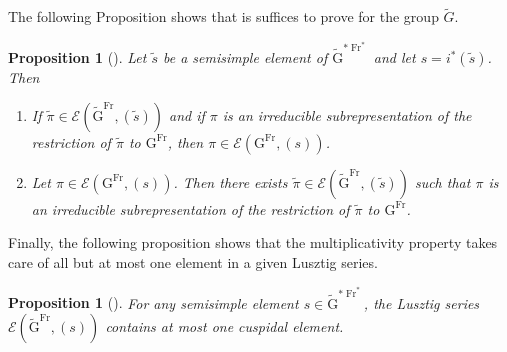 \documentclass[12pt, reqno]{amsart}
\newtheorem{proposition}[theorem]{Proposition}
\theoremstyle{definition}
\theoremstyle{definition}
\theoremstyle{definition}
\newcommand{\GroupExtension}[1]{\widetilde{#1}}
\newcommand{\Frobenius}{\operatorname{Fr}}
\newcommand{\algebraicGroup}[1]{\boldsymbol{\mathrm{#1}}}
\newcommand{\LusztigSeries}[2]{\mathcal{E}\left(#1, (#2)\right)}
\newcommand{\DualFrobeniusFixedPoints}[2][\Frobenius^{\ast}]{\algebraicGroup{#2}^{\ast #1}}
\newcommand{\FrobeniusFixedPoints}[2][\Frobenius]{\algebraicGroup{#2}^{#1}}
\begin{document}
The following Proposition shows that is suffices to prove  for the group $\GroupExtension{G}$.
\begin{proposition}[{\cite[Proposition 11.7]{Bonnafe2006}}]
	Let $\tilde{s}$ be a semisimple element of $\DualFrobeniusFixedPoints{\GroupExtension{G}}$ and let $s = i^{\ast}\left(\tilde{s}\right)$. Then
	\begin{enumerate}
		\item If $\tilde{\pi} \in \LusztigSeries{\FrobeniusFixedPoints{\GroupExtension{G}}}{\tilde{s}}$ and if $\pi$ is an irreducible subrepresentation of the restriction of $\tilde{\pi}$ to $\FrobeniusFixedPoints{G}$, then $\pi \in \LusztigSeries{\FrobeniusFixedPoints{G}}{s}$.
		\item Let $\pi \in \LusztigSeries{\FrobeniusFixedPoints{G}}{s}$. Then there exists $\tilde{\pi} \in \LusztigSeries{\FrobeniusFixedPoints{\GroupExtension{G}}}{\tilde{s}}$ such that $\pi$ is an irreducible subrepresentation of the restriction of $\tilde{\pi}$ to $\FrobeniusFixedPoints{G}$.
	\end{enumerate}
\end{proposition}

Finally, the following proposition shows that the multiplicativity property takes care of all but at most one element in a given Lusztig series.
\begin{proposition}[{\cite[Page 172]{Lusztig1977}}]
	For any semisimple element $s \in \DualFrobeniusFixedPoints{\GroupExtension{G}}$, the Lusztig series $\LusztigSeries{\FrobeniusFixedPoints{\GroupExtension{G}}}{s}$ contains at most one cuspidal element.
\end{proposition}
\end{document}
